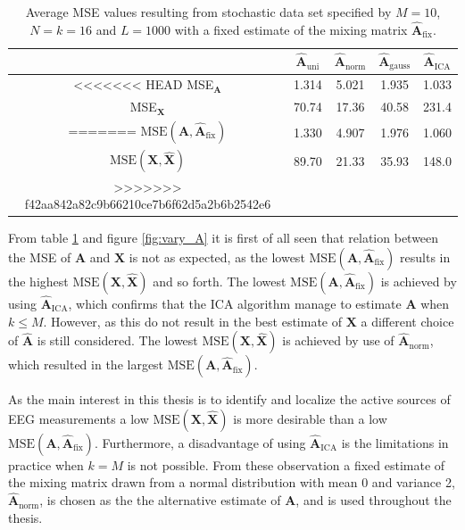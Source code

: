 \begin{table}[H]
\centering
\begin{tabular}{|c|c|c|c|c|}
\hline
 & $\hat{\mathbf{A}}_{\text{uni}}$ & $\hat{\mathbf{A}}_{\text{norm}}$	 & $\hat{\mathbf{A}}_{\text{gauss}}$ & $\hat{\mathbf{A}}_{\text{ICA}}$ \\
\hline
<<<<<<< HEAD
MSE$_\mathbf{A}$ & 1.314 & 5.021 & 1.935 & 1.033 \\
\hline
MSE$_\mathbf{X}$ & 70.74 & 17.36 & 40.58 & 231.4 \\
=======
$\text{MSE}(\mathbf{A}, \hat{\mathbf{A}}_{\text{fix}})$ & 1.330 & 4.907 & 1.976 & 1.060 \\
\hline
$\text{MSE}(\mathbf{X}, \hat{\mathbf{X}})$ & 89.70 & 21.33 & 35.93 & 148.0 \\
>>>>>>> f42aa842a82c9b66210ce7b6f62d5a2b6b2542e6
\hline
\end{tabular}
\caption{Average MSE values resulting from stochastic data set specified by $M=10$, $N=k=16$ and $L=1000$ with a fixed estimate of the mixing matrix $\hat{\mathbf{A}}_{\text{fix}}$.}
\label{tab:fixed}
\end{table}
\noindent
From table \ref{tab:fixed} and figure \ref{fig:vary_A} it is first of all seen that relation between the MSE of $\textbf{A}$ and $\textbf{X}$ is not as expected, as the lowest $\text{MSE}(\mathbf{A}, \hat{\mathbf{A}}_{\text{fix}})$ results in the highest $\text{MSE}(\mathbf{X}, \hat{\mathbf{X}})$ and so forth. 
The lowest $\text{MSE}(\mathbf{A}, \hat{\mathbf{A}}_{\text{fix}})$ is achieved by using $\hat{\mathbf{A}}_{\text{ICA}}$, which confirms that the ICA algorithm manage to estimate $\mathbf{A}$ when $k \leq M$. 
However, as this do not result in the best estimate of $\mathbf{X}$ a different choice of $\hat{\mathbf{A}}$ is still considered. 
The lowest $\text{MSE}(\mathbf{X}, \hat{\mathbf{X}})$ is achieved by use of $\hat{\mathbf{A}}_{\text{norm}}$, which resulted in the largest $\text{MSE}(\mathbf{A}, \hat{\mathbf{A}}_{\text{fix}})$. 
      
As the main interest in this thesis is to identify and localize the active sources of EEG measurements a low $\text{MSE}(\mathbf{X}, \hat{\mathbf{X}})$ is more desirable than a low $\text{MSE}(\mathbf{A}, \hat{\mathbf{A}}_{\text{fix}})$. 
Furthermore, a disadvantage of using $\hat{\mathbf{A}}_{\text{ICA}}$ is the limitations in practice when $k = M$ is not possible.     
From these observation a fixed estimate of the mixing matrix drawn from a normal distribution with mean 0 and variance 2, $\hat{\mathbf{A}}_{\text{norm}}$, is chosen as the the alternative estimate of $\mathbf{A}$, and is used throughout the thesis. 